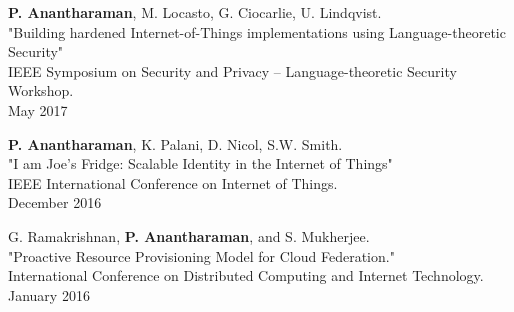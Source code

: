 \documentclass[letterpaper,10pt]{article}
\begin{document}
\begin{etaremune}
    \item {\bf P. Anantharaman}, M. Locasto, G. Ciocarlie, U. Lindqvist.\\
        "Building hardened Internet-of-Things implementations using Language-theoretic Security"\\
        IEEE Symposium on Security and Privacy -- Language-theoretic Security Workshop.\\
        May 2017
\item {\bf P. Anantharaman}, K. Palani, D. Nicol, S.W. Smith.\\
    "I am Joe's Fridge: Scalable Identity in the Internet of Things"\\
    IEEE International Conference on Internet of Things.\\
    December 2016
\item G. Ramakrishnan, {\bf P. Anantharaman}, and S. Mukherjee.\\
    "Proactive Resource Provisioning Model for Cloud Federation."\\
    International Conference on Distributed Computing and Internet Technology.\\
    January 2016
\end{etaremune}



\end{document}
